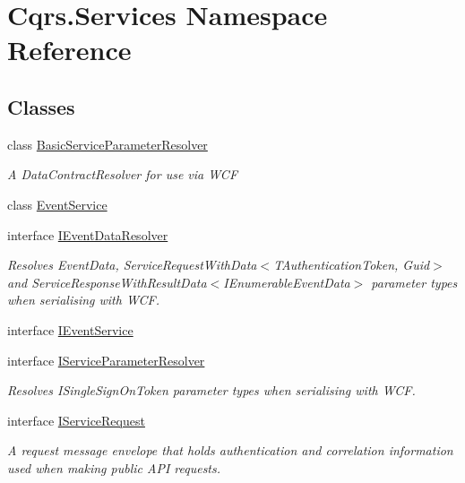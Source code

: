 \hypertarget{namespaceCqrs_1_1Services}{}\section{Cqrs.\+Services Namespace Reference}
\label{namespaceCqrs_1_1Services}
\subsection*{Classes}
\begin{DoxyCompactItemize}
\item 
class \hyperlink{classCqrs_1_1Services_1_1BasicServiceParameterResolver}{Basic\+Service\+Parameter\+Resolver}
\begin{DoxyCompactList}\small\item\em A Data\+Contract\+Resolver for use via W\+CF \end{DoxyCompactList}\item 
class \hyperlink{classCqrs_1_1Services_1_1EventService}{Event\+Service}
\item 
interface \hyperlink{interfaceCqrs_1_1Services_1_1IEventDataResolver}{I\+Event\+Data\+Resolver}
\begin{DoxyCompactList}\small\item\em Resolves Event\+Data, Service\+Request\+With\+Data$<$\+T\+Authentication\+Token, Guid$>$ and Service\+Response\+With\+Result\+Data$<$\+I\+Enumerable\+Event\+Data$>$ parameter types when serialising with W\+CF. \end{DoxyCompactList}\item 
interface \hyperlink{interfaceCqrs_1_1Services_1_1IEventService}{I\+Event\+Service}
\item 
interface \hyperlink{interfaceCqrs_1_1Services_1_1IServiceParameterResolver}{I\+Service\+Parameter\+Resolver}
\begin{DoxyCompactList}\small\item\em Resolves I\+Single\+Sign\+On\+Token parameter types when serialising with W\+CF. \end{DoxyCompactList}\item 
interface \hyperlink{interfaceCqrs_1_1Services_1_1IServiceRequest}{I\+Service\+Request}
\begin{DoxyCompactList}\small\item\em A request message envelope that holds authentication and correlation information used when making public A\+PI requests. \end{DoxyCompactList}\item 

\end{DoxyCompactItemize}
